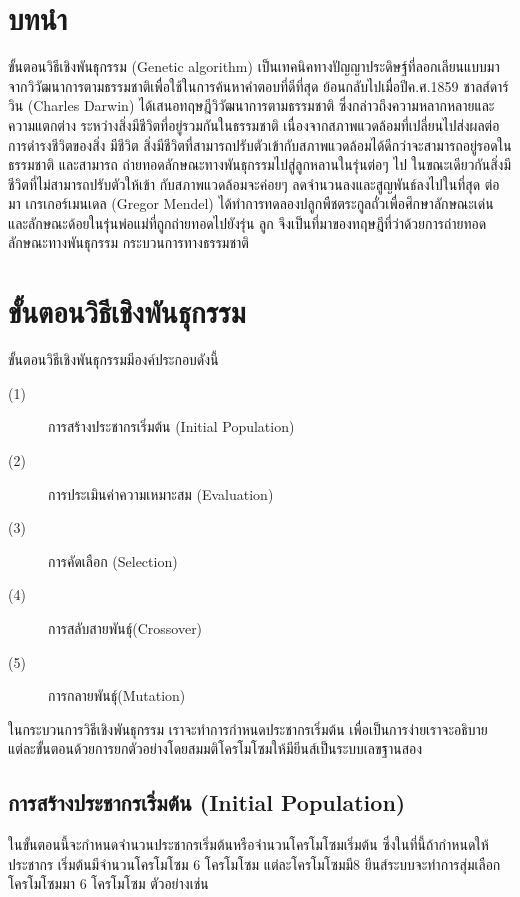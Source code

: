 \documentclass[a4paper,12pt,oneside]{book}
\begin{document}



\clearpage
\thispagestyle{empty}
\tableofcontents
\listoffigures{}
\listoftables {}

\clearpage
{}

\chapter{บทนำ}
ขั้นตอนวิธีเชิงพันธุกรรม (Genetic algorithm) \cite{nontiya} เป็นเทคนิคทางปัญญาประดิษฐ์ที่ลอกเลียนแบบมา
จากวิวัฒนาการตามธรรมชาติเพื่อใช้ในการค้นหาคำตอบที่ดีที่สุด ย้อนกลับไปเมื่อปีค.ศ.1859 ชาลส์ดาร์วิน
(Charles Darwin) ได้เสนอทฤษฎีวิวัฒนาการตามธรรมชาติ ซึ่งกล่าวถึงความหลากหลายและความแตกต่าง
ระหว่างสิ่งมีชีวิตที่อยู่รวมกันในธรรมชาติ เนื่องจากสภาพแวดล้อมที่เปลี่ยนไปส่งผลต่อการดำรงชีวิตของสิ่ง
มีชีวิต สิ่งมีชีวิตที่สามารถปรับตัวเข้ากับสภาพแวดล้อมได้ดีกว่าจะสามารถอยู่รอดในธรรมชาติ และสามารถ
ถ่ายทอดลักษณะทางพันธุกรรมไปสู่ลูกหลานในรุ่นต่อๆ ไป ในขณะเดียวกันสิ่งมีชีวิตที่ไม่สามารถปรับตัวให้เข้า
กับสภาพแวดล้อมจะค่อยๆ ลดจำนวนลงและสูญพันธ์ลงไปในที่สุด ต่อมา เกรเกอร์เมนเดล (Gregor Mendel)
ได้ทำการทดลองปลูกพืชตระกูลถั่วเพื่อศึกษาลักษณะเด่นและลักษณะด้อยในรุ่นพ่อแม่ที่ถูกถ่ายทอดไปยังรุ่น
ลูก จึงเป็นที่มาของทฤษฎีที่ว่าด้วยการถ่ายทอดลักษณะทางพันธุกรรม กระบวนการทางธรรมชาติ

\chapter{ขั้นตอนวิธีเชิงพันธุกรรม}
ขั้นตอนวิธีเชิงพันธุกรรมมีองค์ประกอบดังนี้
\begin{description}
	\item[(1)] การสร้างประชากรเริ่มต้น (Initial Population)
	\item[(2)] การประเมินค่าความเหมาะสม (Evaluation)
	\item[(3)] การคัดเลือก (Selection)
	\item[(4)] การสลับสายพันธุ์(Crossover)
	\item[(5)] การกลายพันธุ์(Mutation) 
\end{description}
ในกระบวนการวิธีเชิงพันธุกรรม เราจะทำการกำหนดประชากรเริ่มต้น เพื่อเป็นการง่ายเราจะอธิบาย
แต่ละขั้นตอนด้วยการยกตัวอย่างโดยสมมติโครโมโซมให้มียีนส์เป็นระบบเลขฐานสอง 
\section{การสร้างประชากรเริ่มต้น (Initial Population)}
ในขั้นตอนนี้จะกำหนดจำนวนประชากรเริ่มต้นหรือจำนวนโครโมโซมเริ่มต้น ซึ่งในที่นี้ถ้ากำหนดให้ประชากร
เริ่มต้นมีจำนวนโครโมโซม 6 โครโมโซม แต่ละโครโมโซมมี8 ยีนส์ระบบจะทำการสุ่มเลือกโครโมโซมมา 6 โครโมโซม
ตัวอย่างเช่น
\end{document}
